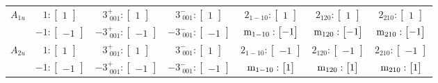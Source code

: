 \documentclass[fleqn,8pt,landscape]{jsarticle}
\begin{document}
\begin{longtable}{ccccccc}
$ A_{1u} $ & $ 1:\begin{bmatrix} 1 \end{bmatrix} $ & $ 3^{+}_{\,\,001}:\begin{bmatrix} 1 \end{bmatrix} $ & $ 3^{-}_{\,\,001}:\begin{bmatrix} 1 \end{bmatrix} $ & $ 2{}_{1-10}:\begin{bmatrix} 1 \end{bmatrix} $ & $ 2{}_{120}:\begin{bmatrix} 1 \end{bmatrix} $ & $ 2{}_{210}:\begin{bmatrix} 1 \end{bmatrix} $ \\
& $ -1:\begin{bmatrix} -1 \end{bmatrix} $ & $ -3^{+}_{\,\,001}:\begin{bmatrix} -1 \end{bmatrix} $ & $ -3^{-}_{\,\,001}:\begin{bmatrix} -1 \end{bmatrix} $ & $ {\rm m}_{1-10}:\begin{bmatrix} -1 \end{bmatrix} $ & $ {\rm m}_{120}:\begin{bmatrix} -1 \end{bmatrix} $ & $ {\rm m}_{210}:\begin{bmatrix} -1 \end{bmatrix} $ \\ \hline
$ A_{2u} $ & $ 1:\begin{bmatrix} 1 \end{bmatrix} $ & $ 3^{+}_{\,\,001}:\begin{bmatrix} 1 \end{bmatrix} $ & $ 3^{-}_{\,\,001}:\begin{bmatrix} 1 \end{bmatrix} $ & $ 2{}_{1-10}:\begin{bmatrix} -1 \end{bmatrix} $ & $ 2{}_{120}:\begin{bmatrix} -1 \end{bmatrix} $ & $ 2{}_{210}:\begin{bmatrix} -1 \end{bmatrix} $ \\
& $ -1:\begin{bmatrix} -1 \end{bmatrix} $ & $ -3^{+}_{\,\,001}:\begin{bmatrix} -1 \end{bmatrix} $ & $ -3^{-}_{\,\,001}:\begin{bmatrix} -1 \end{bmatrix} $ & $ {\rm m}_{1-10}:\begin{bmatrix} 1 \end{bmatrix} $ & $ {\rm m}_{120}:\begin{bmatrix} 1 \end{bmatrix} $ & $ {\rm m}_{210}:\begin{bmatrix} 1 \end{bmatrix} $ \\ \hline

\end{longtable}
\end{document}
